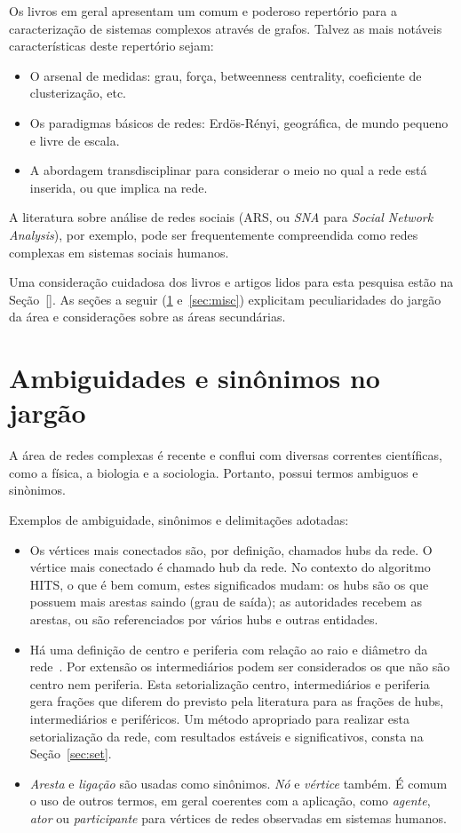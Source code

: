 \documentclass[a4paper,openright,12pt]{report} %
\begin{document}
Os livros em geral apresentam um comum e poderoso repertório para a caracterização de sistemas complexos através de grafos. Talvez as mais notáveis características deste repertório sejam:
\begin{itemize}
	\item O arsenal de medidas: grau, força, betweenness centrality, coeficiente de clusterização, etc.
	\item Os paradigmas básicos de redes: Erdös-Rényi, geográfica, de mundo pequeno e livre de escala.
	\item A abordagem transdisciplinar para considerar o meio no qual a rede está inserida, ou que implica na rede.
\end{itemize}

A literatura sobre análise de redes sociais (ARS, ou \emph{SNA} para \emph{Social Network Analysis}), por exemplo, pode ser frequentemente compreendida como redes complexas em sistemas sociais humanos.

Uma consideração cuidadosa dos livros e artigos lidos para esta pesquisa estão na Seção~\ref{}. As seções a seguir (\ref{sec:jar} e~\ref{sec:misc})
explicitam peculiaridades do jargão da área e considerações sobre as áreas secundárias.

\section{Ambiguidades e sinônimos no jargão}\label{sec:jar}
A área de redes complexas é recente e conflui com diversas 
correntes científicas, como a física, a biologia e a sociologia.
Portanto, possui termos ambiguos e sinònimos.

Exemplos de ambiguidade, sinônimos e delimitações adotadas:
\begin{itemize}
	\item Os vértices mais conectados são, por definição, chamados hubs da rede. O vértice mais conectado é chamado hub da rede. No contexto do algoritmo HITS, o que é bem comum, estes significados mudam: os hubs são os que possuem mais arestas saindo (grau de saída); as autoridades recebem as arestas, ou são referenciados por vários hubs e outras entidades.
	\item Há uma definição de centro e periferia com relação ao raio e diâmetro da rede~\cite{newman,networkX}.
		Por extensão os intermediários podem ser considerados os que não são centro nem periferia.
		Esta setorialização centro, intermediários e periferia gera frações que diferem do previsto pela literatura para as frações de hubs, intermediários e periféricos.
		Um método apropriado para realizar esta setorialização da rede, com resultados estáveis e significativos, consta na Seção~\ref{sec:set}.
	\item \emph{Aresta} e \emph{ligação} são usadas como sinônimos. \emph{Nó} e \emph{vértice} também. É comum o uso de outros termos, em geral coerentes com a aplicação, como \emph{agente}, \emph{ator} ou \emph{participante} para vértices de redes observadas em sistemas humanos.
\end{itemize}
\end{document}
